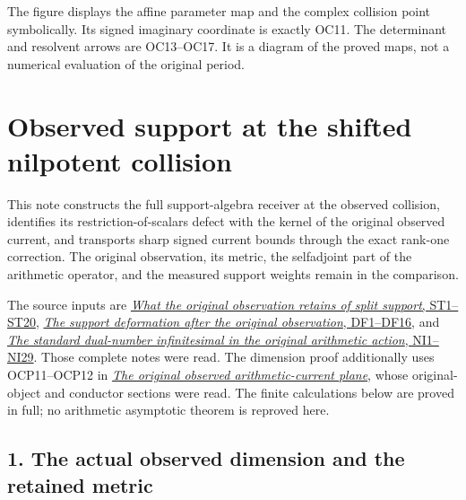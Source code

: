 \documentclass[
]{article}
\begin{document}
The figure displays the affine parameter map and the complex collision
point symbolically. Its signed imaginary coordinate is exactly OC11. The
determinant and resolvent arrows are OC13--OC17. It is a diagram of the
proved maps, not a numerical evaluation of the original period.

\section{Observed support at the shifted nilpotent
collision}\label{observed-support-at-the-shifted-nilpotent-collision}

This note constructs the full support-algebra receiver at the observed
collision, identifies its restriction-of-scalars defect with the kernel
of the original observed current, and transports sharp signed current
bounds through the exact rank-one correction. The original observation,
its metric, the selfadjoint part of the arithmetic operator, and the
measured support weights remain in the comparison.

The source inputs are
\href{https://github.com/KokunoYumeto/zeta-function-research-reader/blob/4ba9285b66af58a6d58fc502a494c1fb45ca5b79/workbenches/splitzero-tandem/continuations/20260922-support-transport/SUPPORT_SPECTRUM_AND_TERMINAL_MASS.md}{\emph{What
the original observation retains of split support}, ST1--ST20},
\href{https://github.com/KokunoYumeto/zeta-function-research-reader/blob/4ba9285b66af58a6d58fc502a494c1fb45ca5b79/workbenches/splitzero-tandem/continuations/20260922-support-transport/OBSERVED_DEFORMATION_AND_CURRENT.md}{\emph{The
support deformation after the original observation}, DF1--DF16}, and
\href{https://github.com/KokunoYumeto/zeta-function-research-reader/blob/6af54ea3c8ef99127af327f3103e086c68d482c2/workbenches/splitzero-tandem/branches/identity-absorber-square/NATIVE_DUAL_NUMBER_RECEIVER.md}{\emph{The
standard dual-number infinitesimal in the original arithmetic action},
NI1--NI29}. Those complete notes were read. The dimension proof
additionally uses OCP11--OCP12 in
\href{https://github.com/KokunoYumeto/zeta-function-research-reader/blob/6af54ea3c8ef99127af327f3103e086c68d482c2/workbenches/splitzero-tandem/branches/identity-absorber-square/sources/OBSERVED_CURRENT_PLANE.tex}{\emph{The
original observed arithmetic-current plane}}, whose original-object and
conductor sections were read. The finite calculations below are proved
in full; no arithmetic asymptotic theorem is reproved here.

\subsection{1. The actual observed dimension and the retained
metric}\label{the-actual-observed-dimension-and-the-retained-metric}
\end{document}
